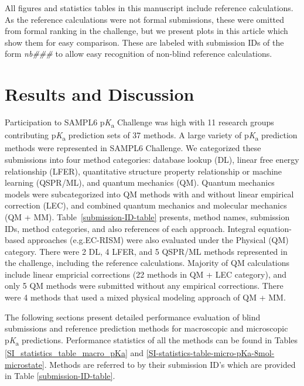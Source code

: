 \documentclass[9pt,lineno,final]{elife}
\newcommand{\pKa}{p\textit{K}\textsubscript{a}}
\begin{document}
All figures and statistics tables in this manuscript include reference calculations. 
As the reference calculations were not formal submissions, these were omitted from formal ranking in the challenge, but we present plots in this article which show them for easy comparison. These are labeled with submission IDs of the form \textit{nb\#\#\#} to allow easy recognition of non-blind reference calculations.

\section{Results and Discussion}


Participation to SAMPL6 \pKa{} Challenge was high with 11 research groups contributing \pKa{} prediction sets of 37 methods.  
A large variety of \pKa{} prediction methods were represented in SAMPL6 Challenge. 
We categorized these submissions into four method categories: database lookup (DL), linear free energy relationship (LFER), quantitative structure property relationship or machine learning (QSPR/ML), and quantum mechanics (QM). 
Quantum mechanics models were subcategorized into QM methods with and without linear empirical correction (LEC), and combined quantum mechanics and molecular mechanics (QM + MM). 
Table~\ref{submission-ID-table} presents, method names, submission IDs, method categories, and also references of each approach. 
Integral equation-based approaches (e.g.EC-RISM) were also evaluated under the Physical (QM) category. There were 2 DL, 4 LFER, and 5 QSPR/ML methods represented in the challenge, including the reference calculations. 
Majority of QM calculations include linear empricial corrections (22 methods in QM + LEC category), and only 5 QM methods were submitted without any empirical corrections. 
There were 4 methods that used a mixed physical modeling approach of QM + MM. 

The following sections present detailed performance evaluation of blind submissions and reference prediction methods for macroscopic and microscopic \pKa{} predictions. Performance statistics of all the methods can be found in Tables \ref{SI_statistics_table_macro_pKa} and \ref{SI-statistics-table-micro-pKa-8mol-microstate}. Methods are referred to by their submission ID's which are provided in Table \ref{submission-ID-table}.
\end{document}
